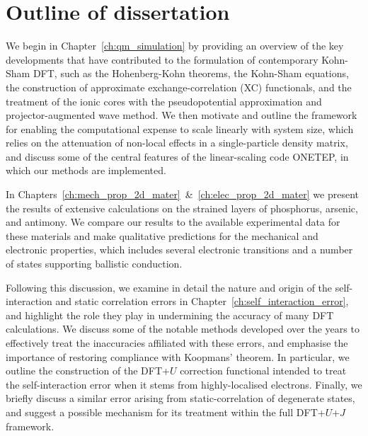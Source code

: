 %


\section{Outline of dissertation}
We begin in Chapter~\ref{ch:qm_simulation} 
by providing an overview of the key developments 
that have contributed to the formulation of contemporary 
Kohn-Sham DFT, 
such as the Hohenberg-Kohn theorems, 
the Kohn-Sham equations, 
the construction of approximate exchange-correlation (XC) functionals, 
and the treatment of the ionic cores 
with the pseudopotential approximation 
and projector-augmented wave method.
%
We then motivate and outline 
the framework for enabling the computational expense 
to scale linearly with system size, 
which relies on the attenuation of non-local effects 
in a single-particle density matrix, 
and discuss some of the central features 
of the linear-scaling code {\sc ONETEP}, 
in which our methods are implemented.



In Chapters~\ref{ch:mech_prop_2d_mater}~\&~\ref{ch:elec_prop_2d_mater} 
we present the results of extensive 
calculations on the strained layers of 
phosphorus, arsenic, and antimony.
%
We compare our results to 
the available experimental data
for these materials 
and make qualitative predictions 
for the mechanical and electronic properties, 
which includes several electronic transitions 
and a number of states supporting ballistic conduction.

Following this discussion, 
we examine in detail the 
nature and origin of the 
self-interaction and static correlation errors 
in Chapter~\ref{ch:self_interaction_error}, 
and highlight the role they play   
in undermining the accuracy of 
many DFT calculations.
%
We discuss some of the notable methods 
developed over the years to effectively treat 
the inaccuracies affiliated with these errors, 
and emphasise the importance of 
restoring compliance with Koopmans' theorem.
%  
In particular, 
we outline the construction 
of the DFT+$U$ correction functional 
intended to treat the self-interaction error  
when it stems from highly-localised electrons.
%
Finally, we briefly discuss a similar 
error arising from static-correlation of degenerate states, 
and suggest a possible mechanism for its treatment  
within the full DFT+$U$+$J$ framework.

